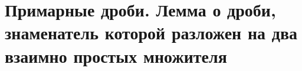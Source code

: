 \section{Примарные дроби. Лемма о дроби, знаменатель которой разложен на два взаимно простых множителя}